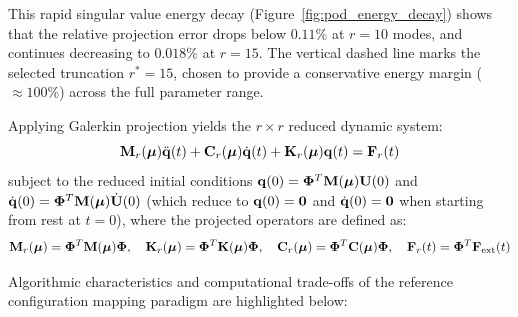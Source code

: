 This rapid singular value energy decay (Figure~\ref{fig:pod_energy_decay}) shows that the relative projection error drops below $0.11\%$ at $r=10$ modes, and continues decreasing to $0.018\%$ at $r=15$. The vertical dashed line marks the selected truncation $r^* = 15$, chosen to provide a conservative energy margin ($\approx 100\%$) across the full parameter range.

Applying Galerkin projection yields the $r \times r$ reduced dynamic system:
\begin{equation}
    \mathbf{M}_r(\boldsymbol{\mu}) \ddot{\mathbf{q}}(t) + \mathbf{C}_r(\boldsymbol{\mu}) \dot{\mathbf{q}}(t) + \mathbf{K}_r(\boldsymbol{\mu}) \mathbf{q}(t) = \mathbf{F}_r(t)
\end{equation}
subject to the reduced initial conditions $\mathbf{q}(0) = \boldsymbol{\Phi}^T \mathbf{M}(\boldsymbol{\mu}) \mathbf{U}(0)$ and $\dot{\mathbf{q}}(0) = \boldsymbol{\Phi}^T \mathbf{M}(\boldsymbol{\mu}) \dot{\mathbf{U}}(0)$ (which reduce to $\mathbf{q}(0) = \mathbf{0}$ and $\dot{\mathbf{q}}(0) = \mathbf{0}$ when starting from rest at $t=0$), where the projected operators are defined as:
\begin{equation}
    \mathbf{M}_r(\boldsymbol{\mu}) = \boldsymbol{\Phi}^T \mathbf{M}(\boldsymbol{\mu}) \boldsymbol{\Phi}, \quad \mathbf{K}_r(\boldsymbol{\mu}) = \boldsymbol{\Phi}^T \mathbf{K}(\boldsymbol{\mu}) \boldsymbol{\Phi}, \quad \mathbf{C}_r(\boldsymbol{\mu}) = \boldsymbol{\Phi}^T \mathbf{C}(\boldsymbol{\mu}) \boldsymbol{\Phi}, \quad \mathbf{F}_r(t) = \boldsymbol{\Phi}^T \mathbf{F}_{\text{ext}}(t)
\end{equation}

Algorithmic characteristics and computational trade-offs of the reference configuration mapping paradigm are highlighted below:

